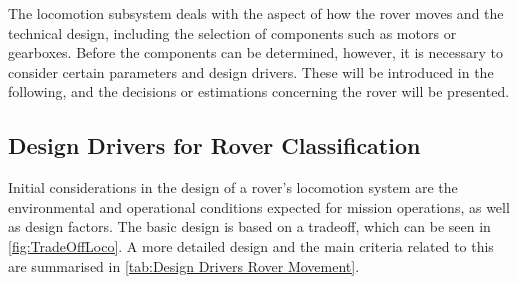 The locomotion subsystem deals with the aspect of how the rover moves and the technical design, including the selection of components such as motors or gearboxes. Before the components can be determined, however, it is necessary to consider certain parameters and design drivers. These will be introduced in the following, and the decisions or estimations concerning the rover will be presented.

\subsection{Design Drivers for Rover Classification}
\label{sec:DesignDriversLoco}

Initial considerations in the design of a rover's locomotion system are the environmental and operational conditions expected for mission operations, as well as design factors. The basic design is based on a tradeoff, which can be seen in \autoref{fig:TradeOffLoco}. A more detailed design and the main criteria related to this are summarised in \autoref{tab:Design Drivers Rover Movement}.

